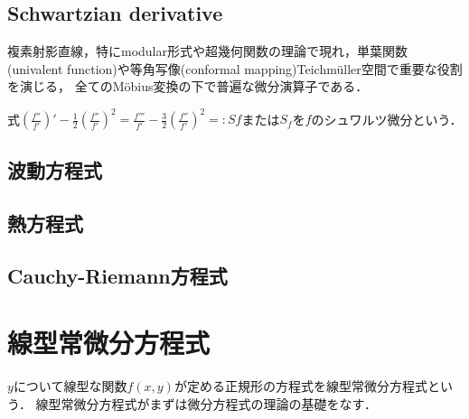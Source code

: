 \documentclass[uplatex,dvipdfmx]{jsreport}
\begin{document}
\section{Schwartzian derivative}
複素射影直線，特にmodular形式や超幾何関数の理論で現れ，単葉関数(univalent function)や等角写像(conformal mapping)Teichmüller空間で重要な役割を演じる，
全てのMöbius変換の下で普遍な微分演算子である．
\begin{definition}
    式$\left(\frac{f''}{f'}\right)'-\frac{1}{2}\left(\frac{f''}{f'}\right)^2=\frac{f'''}{f'}-\frac{3}{2}\left(\frac{f''}{f'}\right)^2=:Sf$または$S_f$を$f$のシュワルツ微分という．
\end{definition}

\section{波動方程式}

\section{熱方程式}

\section{Cauchy-Riemann方程式}

\section{}

\chapter{線型常微分方程式}
$y$について線型な関数$f(x,y)$が定める正規形の方程式を線型常微分方程式という．
線型常微分方程式がまずは微分方程式の理論の基礎をなす．
\end{document}
